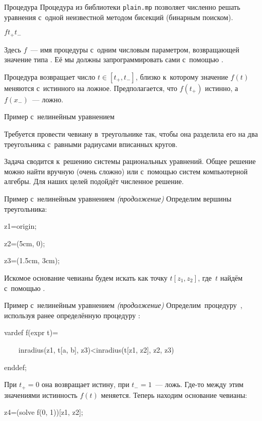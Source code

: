 \begin{frame}{Процедура }
Процедура  из библиотеки \nolinkurl{plain.mp} позволяет численно
решать уравнения с~одной неизвестной методом бисекций (бинарным поиском).

\begin{center}
\LARGE
{}$f$\literal{(}$t_+$\literal{,}$t_-$\literal{)}
\end{center}

Здесь $f$~— имя процедуры с~одним числовым параметром, возвращающей значение
типа . Её мы должны запрограммировать сами с~помощью
.

Процедура  возвращает число $t\in[t_+,t_-]$, близко к~которому
значение $f(t)$ меняются с~истинного на ложное. Предполагается, что $f(t_+)$
истинно, а~$f(x_-)$~— ложно.
\end{frame}

\begin{frame}{Пример с~нелинейным уравнением}
\centerline{}

Требуется провести чевиану в~треугольнике так, чтобы она разделила его на два
треугольника с~равными радиусами вписанных кругов.

Задача сводится к~решению системы рациональных уравнений. Общее решение можно
найти вручную (очень сложно) или с~помощью систем компьютерной алгебры. Для
наших целей подойдёт численное решение.
\end{frame}

\begin{frame}{Пример с~нелинейным уравнением {\mdseries\itshape(продолжение)}}
Определим вершины треугольника:
\begin{programlisting}
z1=origin;\par
z2=(5cm, 0);\par
z3=(1.5cm, 3cm);
\end{programlisting}

Искомое основание чевианы будем искать как точку $t[z_1,z_2]$, где~$t$ найдём
с~помощью .
\end{frame}

\begin{frame}{Пример с~нелинейным уравнением {\mdseries\itshape(продолжение)}}
Определим~процедуру~, используя ранее определённую процедуру
:
\begin{programlisting}
vardef f(expr t)=\par
~~~~inradius(z1, t[a, b], z3)<inradius(t[z1, z2], z2, z3)\par
enddef;
\end{programlisting}

При $t_+=0$ она возвращает истину, при $t_-=1$~— ложь. Где-то между этим
значениями истинность $f(t)$ меняется. Теперь находим основание чевианы:
\begin{programlisting}
z4=(solve f(0, 1))[z1, z2];
\end{programlisting}
\end{frame}

